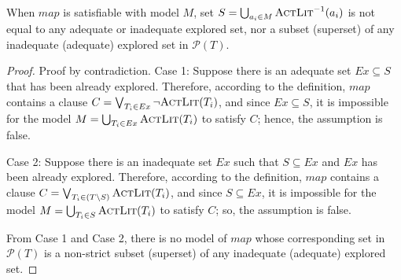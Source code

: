 \begin{lemma}
\label{lem:map:sound}
When $map$ is satisfiable with model $M$, set $S = \bigcup_{a_i \in M} \textsc{ActLit} ^{-1} (a_i)$ is not equal to any adequate or inadequate explored set, nor a subset (superset) of any
inadequate (adequate) explored set in $\mathcal{P}(T)$.
\end{lemma}
\begin{proof}
Proof by contradiction. Case 1: Suppose there is an adequate set $Ex \subseteq S$ that has been already explored. Therefore, according to the definition, $map$ contains a clause $C = \bigvee_{T_{i}\in Ex} \neg {\textsc{ActLit}(T_i)}$, and since $Ex \subseteq S$, it is impossible for the model $M = \bigcup_{T_i \in Ex} \textsc{ActLit} (T_i)$ to satisfy $C$; hence, the assumption is false.

Case 2: Suppose there is an inadequate set $Ex$ such that $S \subseteq Ex$ and $Ex$ has been already explored. Therefore, according to the definition, $map$ contains a clause $C = \bigvee_{T_{i}\in (T \setminus S)} \textsc{ActLit} (T_i)$, and since $S \subseteq Ex$, it is impossible for the model $M = \bigcup_{T_i \in S} \textsc{ActLit} (T_i)$ to satisfy $C$; so, the assumption is false.

From Case 1 and Case 2, there is no model of $map$ whose corresponding set in $\mathcal{P}(T)$ is a non-strict subset (superset) of any inadequate (adequate) explored set.
\end{proof}


